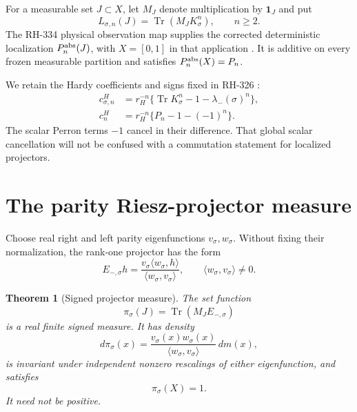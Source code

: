 \documentclass[11pt]{article}
\newtheorem{theorem}{Theorem}[section]
\theoremstyle{remark}
\newcommand{\Tr}{\operatorname{Tr}}
\newcommand{\one}{\mathbf 1}
\begin{document}
For a measurable set $J\subset X$, let $M_J$ denote multiplication by
$\one_J$ and put
\begin{equation}\label{eq:L-local}
 L_{\sigma,n}(J)=\Tr(M_JK_\sigma^n),\qquad n\ge2.
\end{equation}
The RH-334 physical observation map supplies the corrected deterministic
localization $P_n^{\rm abs}(J)$, with $X=[0,1]$ in that application
\citep{WangObservation2026}.  It is additive on every frozen measurable
partition and satisfies $P_n^{\rm abs}(X)=P_n$.

We retain the Hardy coefficients and signs fixed in RH-326
\citep{WangFirstAlias2026}:
\begin{align}
 c^H_{\sigma,n}
 &=r_H^{-n}\{\Tr K_\sigma^n-1-\lambda_-(\sigma)^n\},
 \label{eq:c-noisy}\\
 c^H_n
 &=r_H^{-n}\{P_n-1-(-1)^n\}.
 \label{eq:c-deterministic}
\end{align}
The scalar Perron terms $-1$ cancel in their difference.  That global scalar
cancellation will not be confused with a commutation statement for localized
projectors.

\section{The parity Riesz-projector measure}

Choose real right and left parity eigenfunctions $v_\sigma,w_\sigma$.
Without fixing their normalization, the rank-one projector has the form
\begin{equation}\label{eq:rank-one}
 E_{-,\sigma}h
 =\frac{v_\sigma\langle w_\sigma,h\rangle}
 {\langle w_\sigma,v_\sigma\rangle},
 \qquad \langle w_\sigma,v_\sigma\rangle\ne0.
\end{equation}

\begin{theorem}[Signed projector measure]\label{thm:projector-measure}
The set function
\begin{equation}\label{eq:pi-def}
 \boxed{\pi_\sigma(J)=\Tr(M_JE_{-,\sigma})}
\end{equation}
is a real finite signed measure.  It has density
\begin{equation}\label{eq:pi-density}
 d\pi_\sigma(x)
 =\frac{v_\sigma(x)w_\sigma(x)}
 {\langle w_\sigma,v_\sigma\rangle}\,dm(x),
\end{equation}
is invariant under independent nonzero rescalings of either eigenfunction,
and satisfies
\begin{equation}\label{eq:pi-total}
 \pi_\sigma(X)=1.
\end{equation}
It need not be positive.
\end{theorem}
\end{document}
